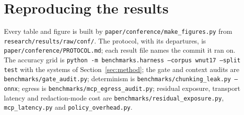 \documentclass[conference]{IEEEtran}
\begin{document}
\ifdefined\noappendix\else
\appendix
\section{Reproducing the results}\label{app:repro}
Every table and figure is built by \texttt{paper/conference/make\_figures.py} from \texttt{research/results/raw/conf/}. The protocol, with its departures, is \texttt{paper/conference/PROTOCOL.md}; each result file names the commit it ran on. The accuracy grid is \texttt{python -m benchmarks.harness --corpus wnut17 --split test} with the systems of Section~\ref{sec:method}; the gate and context audits are \texttt{benchmarks/gate\_audit.py}; determinism is \texttt{benchmarks/chunking\_leak.py --onnx}; egress is \texttt{benchmarks/mcp\_egress\_audit.py}; residual exposure, transport latency and redaction-mode cost are \texttt{benchmarks/residual\_exposure.py}, \texttt{mcp\_latency.py} and \texttt{policy\_overhead.py}.

\fi


\begingroup\sloppy

\endgroup
\end{document}
